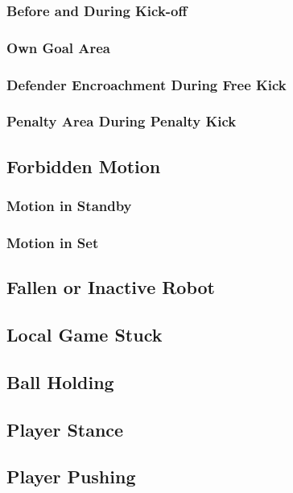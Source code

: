 \subsubsection{Before and During Kick-off}
\subsubsection{Own Goal Area}
\subsubsection{Defender Encroachment During Free Kick}
\subsubsection{Penalty Area During Penalty Kick}

\subsection{Forbidden Motion}
\label{sec:forbidden_motion}

\subsubsection{Motion in Standby}
\subsubsection{Motion in Set}

\subsection{Fallen or Inactive Robot}
\label{sec:fallen_robot}

\subsection{Local Game Stuck}
\label{sec:local_game_stuck}

\subsection{Ball Holding}
\label{sec:ball_holding}

\subsection{Player Stance}
\label{sec:player_stance}

\subsection{Player Pushing}
\label{sec:player_pushing}

